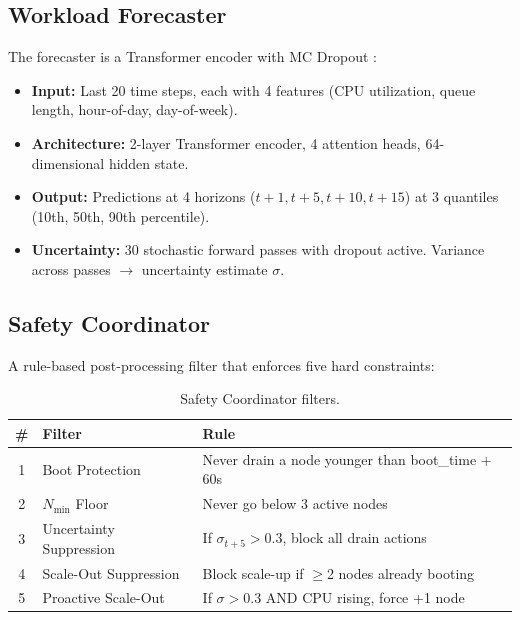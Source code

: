 \documentclass[12pt,a4paper]{article}
\begin{document}
\subsection{Workload Forecaster}

The forecaster is a Transformer encoder \cite{vaswani2017attention} with
MC Dropout \cite{gal2016dropout}:

\begin{itemize}
  \item \textbf{Input:} Last 20 time steps, each with 4 features (CPU
        utilization, queue length, hour-of-day, day-of-week).
  \item \textbf{Architecture:} 2-layer Transformer encoder, 4 attention heads,
        64-dimensional hidden state.
  \item \textbf{Output:} Predictions at 4 horizons ($t{+}1, t{+}5, t{+}10,
        t{+}15$) at 3 quantiles (10th, 50th, 90th percentile).
  \item \textbf{Uncertainty:} 30 stochastic forward passes with dropout active.
        Variance across passes $\rightarrow$ uncertainty estimate $\sigma$.
\end{itemize}

\subsection{Safety Coordinator}

A rule-based post-processing filter that enforces five hard constraints:

\begin{table}[H]
\centering
\caption{Safety Coordinator filters.}
\label{tab:safety}
\begin{tabular}{clp{7.5cm}}
\toprule
\textbf{\#} & \textbf{Filter} & \textbf{Rule} \\
\midrule
1 & Boot Protection & Never drain a node younger than boot\_time + 60s \\
2 & $N_{\min}$ Floor & Never go below 3 active nodes \\
3 & Uncertainty Suppression & If $\sigma_{t+5} > 0.3$, block all drain actions \\
4 & Scale-Out Suppression & Block scale-up if $\geq$2 nodes already booting \\
5 & Proactive Scale-Out & If $\sigma > 0.3$ AND CPU rising, force +1 node \\
\bottomrule
\end{tabular}
\end{table}
\end{document}
